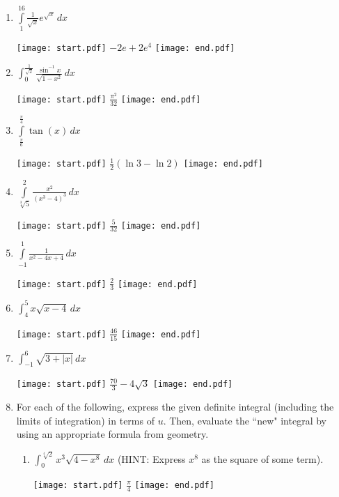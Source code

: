 \documentclass[12pt]{article}
\begin{document}
\begin{enumerate}
\item $\int\limits_{1}^{16}\frac{1}{\sqrt{x}}e^{\sqrt{x}}\,dx$ 

\texttt{[image: start.pdf]}
{{$-2e+2e^{4}$}}
\texttt{[image: end.pdf]}


\item $\int_0^{\frac{1}{\sqrt{2}}} \frac{\sin^{-1}{x}}{\sqrt{1-x^2}} \,dx$

\texttt{[image: start.pdf]}
{{$\frac{\pi^2}{32}$}}
\texttt{[image: end.pdf]}


\item $\int\limits_{\frac{\pi}{6}}^{\frac{\pi}{4}}\tan{(x)}\,dx$ 

\texttt{[image: start.pdf]}
{{$\frac{1}{2}(\ln{3}-\ln{2})$}}
\texttt{[image: end.pdf]}


\item $\int\limits_{\sqrt[3]{5}}^{2}\frac{x^2}{(x^3-4)^3}\,dx$ 

\texttt{[image: start.pdf]}
{{$\frac{5}{32}$}}
\texttt{[image: end.pdf]}


\item $\int\limits_{-1}^{1}\frac{1}{x^2-4x+4}\,dx$ 

\texttt{[image: start.pdf]}
{{$\frac{2}{3}$}}
\texttt{[image: end.pdf]}


\item $\int_4^5 x\sqrt{x-4} \,dx$

\texttt{[image: start.pdf]}
{{$\frac{46}{15}$}}
\texttt{[image: end.pdf]}


\item $\int_{-1}^6 \sqrt{3+|x|} \,dx$

\texttt{[image: start.pdf]}
{{$\frac{70}{3}-4\sqrt{3}$}}
\texttt{[image: end.pdf]}


\item For each of the following, express the given definite integral (including the limits of integration) in terms of $u$.  Then, evaluate the ``new" integral by using an appropriate formula from geometry.

\begin{enumerate}

\item $\int_0^{\sqrt[4]{2}} x^3\sqrt{4-x^8} \,dx$ (HINT: Express $x^8$ as the square of some term).

\texttt{[image: start.pdf]}
{{$\frac{\pi}{4}$}}
\texttt{[image: end.pdf]}



\end{enumerate}
\end{enumerate}
\end{document}
